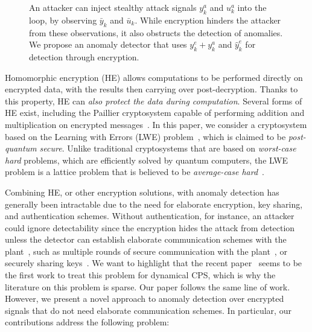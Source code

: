 \documentclass[journal, twoside, web]{ieeecolorpreprint}
\begin{document}
\begin{figure}
{}
     \caption{An attacker can inject stealthy attack signals $y^a_k$ and $u^a_k$ into the loop, by observing $\bar y_k$ and $\bar u_k$. While encryption hinders the attacker from these observations, it also obstructs the detection of anomalies. We propose an anomaly detector that uses {$y^e_k+y_k^a$} and $\hat{y}^e_k$ for detection through encryption.} \label{fig:adv_attack__vector6}
\end{figure}

Homomorphic encryption (HE) allows computations to be performed directly on encrypted data, with the results then carrying over post-decryption. Thanks to this property, HE can \emph{also protect the data during computation}. Several forms of HE exist, including the Paillier cryptosystem capable of performing addition and multiplication on encrypted messages~\cite{paillier1999}. In this paper, we consider a cryptosystem based on the Learning with Errors (LWE) problem~\cite{regev2009}, which is claimed to be \emph{post-quantum secure}. Unlike traditional cryptosystems that are based on \emph{worst-case hard} problems, which are efficiently solved by quantum computers, the LWE problem is a lattice problem that is believed to be \emph{average-case hard}~\cite{ajtai1996}.

Combining HE, or other encryption solutions, with anomaly detection has generally been intractable due to the need for elaborate encryption, key sharing, and authentication schemes. Without authentication, for instance, an attacker could ignore detectability since the encryption hides the attack from detection unless the detector can establish elaborate communication schemes with the plant~\cite{alexandru2022}, such as multiple rounds of secure communication with the plant~\cite{buns2018}, or securely sharing keys~\cite{alisic2023modelfreelwe}. We want to highlight that the recent paper~\cite{alexandru2022} seems to be the first work to treat this problem for dynamical CPS, which is why the literature on this problem is sparse. Our paper follows the same line of work. However, we present a novel approach to anomaly detection over encrypted signals that do not need elaborate communication schemes. In particular, our contributions address the following problem:
\end{document}
